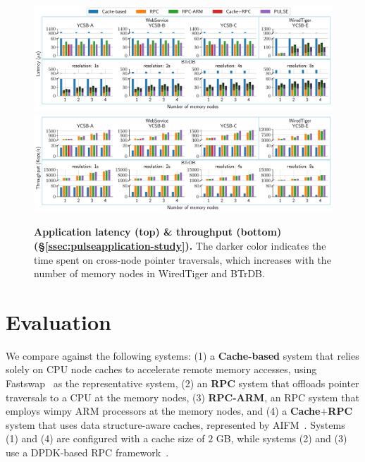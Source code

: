 \begin{figure}[t]
\centering
  \includegraphics[width=\textwidth]{fig/pulse/latency.pdf}
  \\
  \includegraphics[width=\textwidth]{fig/pulse/throughput.pdf}
  \caption[Application latency \& throughput]{\textbf{Application latency (top) \& throughput (bottom) (\S\ref{ssec:pulseapplication-study}).} 
  The darker color indicates the time spent on cross-node pointer traversals, which increases with the number of memory nodes in WiredTiger and BTrDB.}
\label{fig:eval_perf_e2e_latency}
\label{fig:eval_perf_e2e_throughput}
\end{figure}

\section{Evaluation}
\label{sec:pulseevaluation}



 We compare \pulse against the following systems: 
(1) a \textbf{Cache-based} system that relies solely on CPU node caches to accelerate remote memory accesses, using Fastswap~\cite{fastswap} as the representative system, 
(2) an \textbf{RPC} system that offloads pointer traversals to a CPU at the memory nodes, 
(3) \textbf{RPC-ARM}, an RPC system that employs wimpy ARM processors at the memory nodes, and 
(4) a \textbf{Cache$+$RPC} system that uses data structure-aware caches, represented by AIFM~\cite{aifm}. Systems (1) and (4) are configured with a cache size of $2$ GB, while systems (2) and (3) use a DPDK-based RPC framework~\cite{erpc}.

